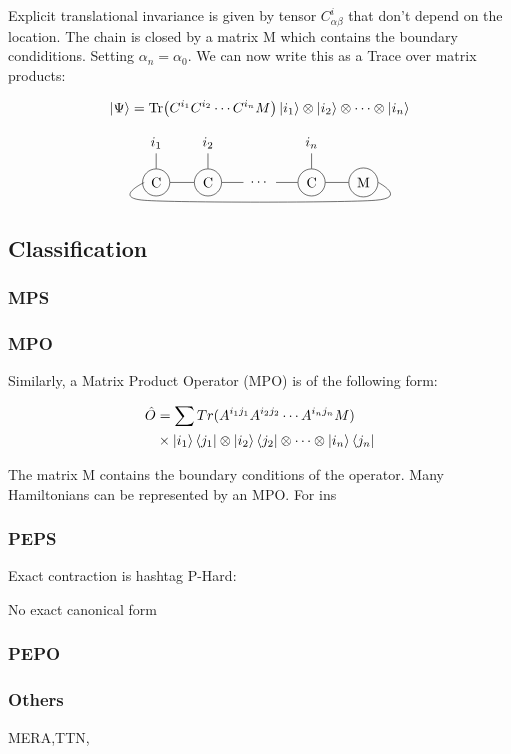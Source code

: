 Explicit translational invariance is given by tensor $C^i_{\alpha \beta }$ that don't depend on the location. The chain is closed by a matrix M which contains the boundary condiditions. Setting $\alpha_n = \alpha_0$. We can now write this as a Trace over matrix products:

\begin{equation}
    \ket{\Psi} = \Tr( C^{i_1} C^{i_2} \cdots C^{i_n} M  ) \ket{i_1} \otimes \ket{i_2} \otimes \cdots \otimes \ket{i_n}
\end{equation}

\begin{equation}
    \mpo{5}{{"Tr",,,,,}}{{"$i_1$","$i_2$",,"$i_n$","-"}}{{"-","-",,"-","-"}}{{0,0,1,0,0}}{{"C", "C",,"C","M" }}
\end{equation}

\subsection{Classification}

\subsubsection{MPS}

\subsubsection{MPO}

Similarly, a Matrix Product Operator (MPO) is of the following form:

\begin{equation} \label{def_mpo}
    \begin{split}
        \hat{O} &= \sum Tr(A^{i_1 j_1} A^{i_2 j_2} \cdots A^{i_n j_n} M) \\
        & \times \ket{i_1}\bra{j_1} \otimes \ket{i_2}\bra{j_2} \otimes \cdots \otimes \ket{i_n}\bra{j_n}
    \end{split}
\end{equation}


The matrix M contains the boundary conditions of the operator. Many Hamiltonians can be represented by an MPO. For ins

\subsubsection{PEPS}

Exact contraction is hashtag P-Hard:

No exact canonical form

\subsubsection{PEPO}

\subsubsection{Others}

MERA,TTN,


